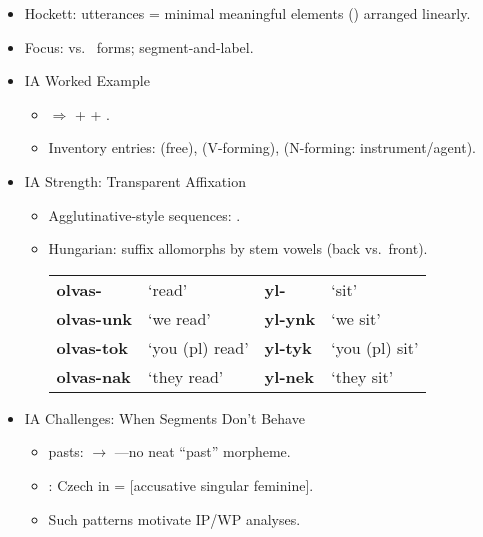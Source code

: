 \documentclass[a4paper,landscape,headrule,footrule]{foils}
\begin{document}
\begin{itemize}
  \item Hockett: utterances = minimal meaningful elements () arranged linearly.
  \item Focus:  vs.\  forms; segment-and-label.
  \item IA Worked Example
    \begin{itemize}
    \item {} $\Rightarrow$  +  + .
    \item Inventory entries:  (free),  (V-forming),  (N-forming: instrument/agent).
    \end{itemize}
  \end{itemize}
  
\begin{itemize}
\item IA Strength: Transparent Affixation
    \begin{itemize}
    \item Agglutinative-style sequences: .
    \item Hungarian: suffix allomorphs by stem vowels (back vs.\ front). \\
      	\begin{tabular}{llll}
	\textbf{olvas-} & `read'	& \textbf{yl-} & `sit'\\
	\textbf{olvas-unk}	& `we read'	& \textbf{yl-ynk	} & `we sit'\\
	\textbf{olvas-tok}	& `you (pl) read'	& \textbf{yl-tyk} & 	`you (pl) sit'\\
	\textbf{olvas-nak}	& `they read'	& \textbf{yl-nek}	& `they sit'\\
	\end{tabular}

    \end{itemize}
  \item IA Challenges: When Segments Don’t Behave
    \begin{itemize}
    \item {} pasts:  $\rightarrow$ —no neat “past” morpheme.
    \item {}: Czech  in  = [accusative singular feminine].
    \item Such patterns motivate IP/WP analyses.
    \end{itemize}
  \end{itemize}
\end{document}
